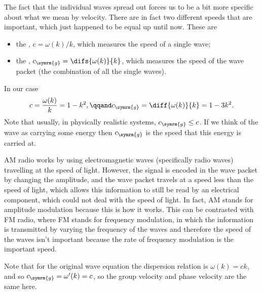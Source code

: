 \documentclass[fleqn]{NotesClass}
\newcommand{\groupVelocity}{c_{\symrm{g}}}
\begin{document}
    The fact that the individual waves spread out forces us to be a bit more specific about what we mean by velocity.
    There are in fact two different speeds that are important, which just happened to be equal up until now.
    These are
    \begin{itemize}
        \item the , \(c = \omega(k)/k\), which measures the speed of a single wave;
        \item the , \(\groupVelocity = \difs{\omega(k)}{k}\), which measures the speed of the wave packet (the combination of all the single waves).
    \end{itemize}
    In our case
    \begin{equation}
        c = \frac{\omega(k)}{k} = 1 - k^2, \qqand \groupVelocity = \diff{\omega(k)}{k} = 1 - 3k^2.
    \end{equation}
    Note that usually, in physically realistic systems, \(\groupVelocity \le c\).
    If we think of the wave as carrying some energy then \(\groupVelocity\) is the speed that this energy is carried at.
    
    \begin{app}{}{}
        AM radio works by using electromagnetic waves (specifically radio waves) travelling at the speed of light.
        However, the signal is encoded in the wave packet by changing the amplitude, and the wave packet travels at a speed less than the speed of light, which allows this information to still be read by an electrical component, which could not deal with the speed of light.
        In fact, AM stands for amplitude modulation because this is how it works.
        This can be contrasted with FM radio, where FM stands for frequency modulation, in which the information is transmitted by varying the frequency of the waves and therefore the speed of the waves isn't important because the rate of frequency modulation is the important speed.
    \end{app}
    
    Note that for the original wave equation the dispersion relation is \(\omega(k) = ck\), and so \(\groupVelocity = \omega'(k) = c\), so the group velocity and phase velocity are the same here.
    
\end{document}

